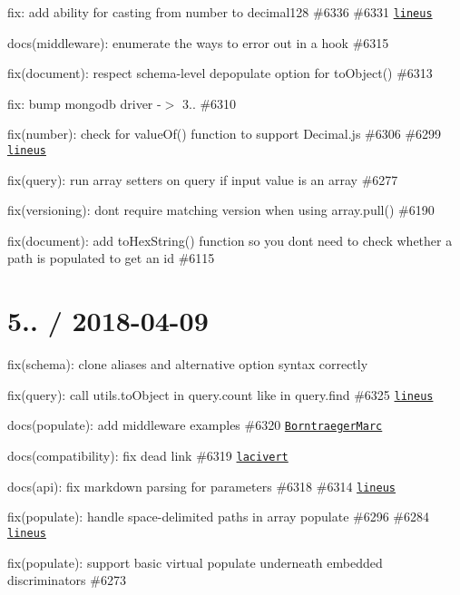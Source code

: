 \begin{DoxyItemize}
\item fix\+: add ability for casting from number to decimal128 \#6336 \#6331 \href{https://github.com/lineus}{\tt lineus}
\item docs(middleware)\+: enumerate the ways to error out in a hook \#6315
\item fix(document)\+: respect schema-\/level depopulate option for to\+Object() \#6313
\item fix\+: bump mongodb driver -\/$>$ 3.. \#6310
\item fix(number)\+: check for {\ttfamily value\+Of()} function to support Decimal.\+js \#6306 \#6299 \href{https://github.com/lineus}{\tt lineus}
\item fix(query)\+: run array setters on query if input value is an array \#6277
\item fix(versioning)\+: don\textquotesingle{}t require matching version when using array.\+pull() \#6190
\item fix(document)\+: add {\ttfamily to\+Hex\+String()} function so you don\textquotesingle{}t need to check whether a path is populated to get an id \#6115
\end{DoxyItemize}

\section*{5.. / 2018-\/04-\/09 }


\begin{DoxyItemize}
\item fix(schema)\+: clone aliases and alternative option syntax correctly
\item fix(query)\+: call utils.\+to\+Object in query.\+count like in query.\+find \#6325 \href{https://github.com/lineus}{\tt lineus}
\item docs(populate)\+: add middleware examples \#6320 \href{https://github.com/BorntraegerMarc}{\tt Borntraeger\+Marc}
\item docs(compatibility)\+: fix dead link \#6319 \href{https://github.com/lacivert}{\tt lacivert}
\item docs(api)\+: fix markdown parsing for parameters \#6318 \#6314 \href{https://github.com/lineus}{\tt lineus}
\item fix(populate)\+: handle space-\/delimited paths in array populate \#6296 \#6284 \href{https://github.com/lineus}{\tt lineus}
\item fix(populate)\+: support basic virtual populate underneath embedded discriminators \#6273
\end{DoxyItemize}

